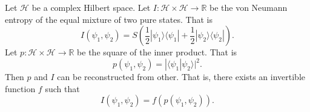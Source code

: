 \documentclass[10pt,twocolumn, nofootinbib]{revtex4-2}
\def\>{\rangle}
\def\<{\langle}
\begin{document}
Let $\mathcal{H}$ be a complex Hilbert space. Let $I : \mathcal{H} \times \mathcal{H} \to \mathbb{R}$ be the von Neumann entropy of the equal mixture of two pure states. That is
\begin{equation}
	I(\psi_1, \psi_2) = S\left(\frac{1}{2}|\psi_1\>\<\psi_1| + \frac{1}{2}|\psi_2\>\<\psi_2|\right).
\end{equation}
Let $p :  \mathcal{H} \times \mathcal{H} \to \mathbb{R}$ be the square of the inner product. That is
\begin{equation}
	p(\psi_1, \psi_2) = |\<\psi_1| \psi_2\>|^2.
\end{equation}
Then $p$ and $I$ can be reconstructed from other. That is, there exists an invertible function $f$ such that
\begin{equation}
	I(\psi_1, \psi_2) = f(p(\psi_1, \psi_2)).
\end{equation}
\end{document}
